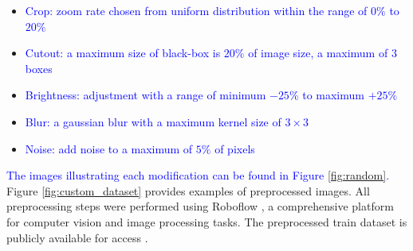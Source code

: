 \begin{itemize}
    \item{\textcolor{blue}{Crop: zoom rate chosen from uniform distribution within the range of $0\%$ to $20\%$}}
    \item{\textcolor{blue}{Cutout: a maximum size of black-box is $20\%$ of image size, a maximum of $3$ boxes}}
    \item{\textcolor{blue}{Brightness: adjustment with a range of minimum $-25\%$ to maximum $+25\%$}}
    \item{\textcolor{blue}{Blur: a gaussian blur with a maximum kernel size of $3 \times 3$}}
    \item{\textcolor{blue}{Noise: add noise to a maximum of $5\%$ of pixels}}
\end{itemize}
\textcolor{blue}{The images illustrating each modification can be found in Figure \ref{fig:random}.}
Figure \ref{fig:custom_dataset} provides examples of preprocessed images.
All preprocessing steps were performed using Roboflow \cite{roboflow}, a comprehensive platform for computer vision and image processing tasks.
The preprocessed train dataset is publicly available for access \cite{brake-light-detection_dataset}.

